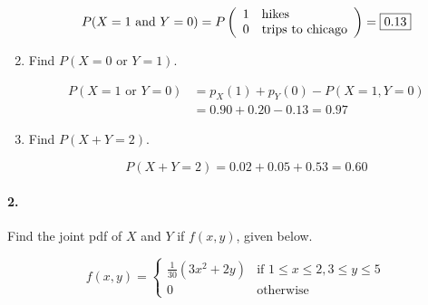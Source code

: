 \begin{enumerate}[label=(\alph*)]
        \begin{mdframed}
            \begin{equation*}
                P(X = 1 \text { and } Y = 0) = P\left(\begin{array}{l l} 1 & \text{hikes} \\ 0 & \text{trips to chicago} \end{array}\right) = \boxed{0.13}
            \end{equation*}
        \end{mdframed}

        \item Find $P(X = 0 \text { or } Y = 1)$.
        
        \begin{mdframed}
            \begin{align*}
                P(X = 1 \text { or } Y = 0) & = p_{X}(1) + p_{Y}(0) - P(X = 1, Y = 0)   \\
                                            & = 0.90 + 0.20 - 0.13 = \boxed{0.97}
            \end{align*}
        \end{mdframed}

        \item Find $P(X + Y = 2)$.
        
        \begin{mdframed}
            \begin{equation*}
                P(X + Y = 2) = 0.02 + 0.05 + 0.53 = \boxed{0.60}
            \end{equation*}
        \end{mdframed}
    \end{enumerate}

    \pagebreak

    \paragraph*{2.}
    Find the joint pdf of $X$ and $Y$ if $f(x,y)$, given below.

    \begin{equation*}
        f(x,y) = \begin{cases}
            \frac{1}{30}(3x^{2} + 2y) & \text{if } 1 \leq x \leq 2, 3 \leq y \leq 5 \\
            0 & \text{otherwise}
        \end{cases}
    \end{equation*}

